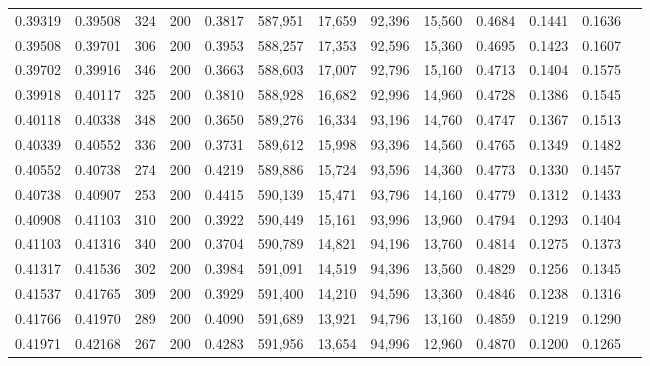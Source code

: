 \begin{tabular}{rrrrrrrrrrrrr}
0.39319 & 0.39508 &   324 & 200 &                                     0.3817 & 587,951 &  17,659 &  92,396 &  15,560 & 0.4684 & 0.1441 & 0.1636 \\
0.39508 & 0.39701 &   306 & 200 &                                     0.3953 & 588,257 &  17,353 &  92,596 &  15,360 & 0.4695 & 0.1423 & 0.1607 \\
0.39702 & 0.39916 &   346 & 200 &                                     0.3663 & 588,603 &  17,007 &  92,796 &  15,160 & 0.4713 & 0.1404 & 0.1575 \\
0.39918 & 0.40117 &   325 & 200 &                                     0.3810 & 588,928 &  16,682 &  92,996 &  14,960 & 0.4728 & 0.1386 & 0.1545 \\
0.40118 & 0.40338 &   348 & 200 &                                     0.3650 & 589,276 &  16,334 &  93,196 &  14,760 & 0.4747 & 0.1367 & 0.1513 \\
0.40339 & 0.40552 &   336 & 200 &                                     0.3731 & 589,612 &  15,998 &  93,396 &  14,560 & 0.4765 & 0.1349 & 0.1482 \\
0.40552 & 0.40738 &   274 & 200 &                                     0.4219 & 589,886 &  15,724 &  93,596 &  14,360 & 0.4773 & 0.1330 & 0.1457 \\
0.40738 & 0.40907 &   253 & 200 &                                     0.4415 & 590,139 &  15,471 &  93,796 &  14,160 & 0.4779 & 0.1312 & 0.1433 \\
0.40908 & 0.41103 &   310 & 200 &                                     0.3922 & 590,449 &  15,161 &  93,996 &  13,960 & 0.4794 & 0.1293 & 0.1404 \\
0.41103 & 0.41316 &   340 & 200 &                                     0.3704 & 590,789 &  14,821 &  94,196 &  13,760 & 0.4814 & 0.1275 & 0.1373 \\
0.41317 & 0.41536 &   302 & 200 &                                     0.3984 & 591,091 &  14,519 &  94,396 &  13,560 & 0.4829 & 0.1256 & 0.1345 \\
0.41537 & 0.41765 &   309 & 200 &                                     0.3929 & 591,400 &  14,210 &  94,596 &  13,360 & 0.4846 & 0.1238 & 0.1316 \\
0.41766 & 0.41970 &   289 & 200 &                                     0.4090 & 591,689 &  13,921 &  94,796 &  13,160 & 0.4859 & 0.1219 & 0.1290 \\
0.41971 & 0.42168 &   267 & 200 &                                     0.4283 & 591,956 &  13,654 &  94,996 &  12,960 & 0.4870 & 0.1200 & 0.1265 \\

\end{tabular}
